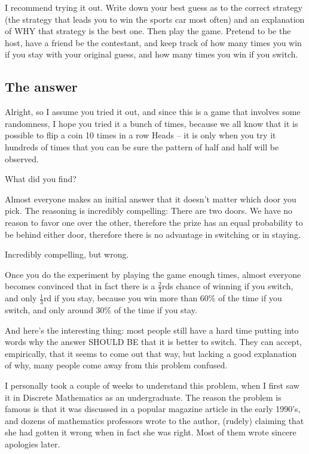 I recommend trying it out.  Write down your best guess as to the
correct strategy (the strategy that leads you to win the sports car
most often) and an explanation of WHY that strategy is the best one.
Then play the game.  Pretend to be the host, have a friend be the
contestant, and keep track of how many times you win if you stay with
your original guess, and how many times you win if you switch.


\subsection{The answer}
Alright, so I assume you tried it out, and since this is a game that
involves some randomness, I hope you tried it a bunch of times,
because we all know that it is possible to flip a coin 10 times in a
row Heads -- it is only when you try it hundreds of times that you can
be sure the pattern of half and half will be observed.


What did you find?


Almost everyone makes an initial answer that it doesn't matter which
door you pick.  The reasoning is incredibly compelling: There are two
doors.  We have no reason to favor one over the other, therefore the
prize has an equal probability to be behind either door, therefore
there is no advantage in switching or in staying.


Incredibly compelling, but wrong.


Once you do the experiment by playing the game enough times, almost
everyone becomes convinced that in fact there is a $\frac{2}{3}$rds
chance of winning if you switch, and only $\frac{1}{3}$rd if you stay,
because you win more than 60\% of the time if you switch, and only
around 30\% of the time if you stay.


And here's the interesting thing: most people still have a hard time
putting into words why the answer SHOULD BE that it is better to
switch.  They can accept, empirically, that it seems to come out that
way, but lacking a good explanation of why, many people come away from
this problem confused.


I personally took a couple of weeks to understand this problem, when I
first saw it in Discrete Mathematics as an undergraduate.  The reason
the problem is famous is that it was discussed in a popular magazine
article in the early 1990's, and dozens of mathematics professors
wrote to the author, (rudely) claiming that she had gotten it wrong
when in fact she was right.  Most of them wrote sincere apologies
later.


